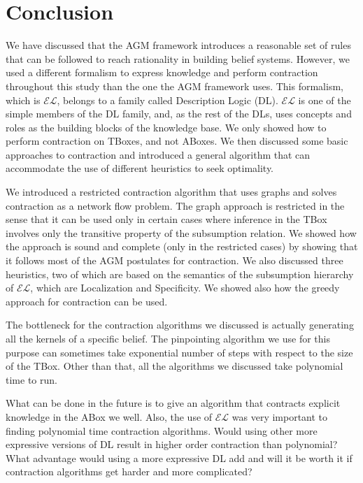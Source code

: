 \chapter{Conclusion}
We have discussed that the AGM framework introduces a reasonable set of rules that can be followed to reach rationality in building belief systems. However, we used a different formalism to express knowledge and perform contraction throughout this study than the one the AGM framework uses. This formalism, which is $\mathcal{EL}$, belongs to a family called Description Logic (DL). $\mathcal{EL}$ is one of the simple members of the DL family, and, as the rest of the DLs, uses concepts and roles as the building blocks of the knowledge base. We only showed how to perform contraction on TBoxes, and not ABoxes. We then discussed some basic approaches to contraction and introduced a general algorithm that can accommodate the use of different heuristics to seek optimality. 

We introduced a restricted contraction algorithm that uses graphs and solves contraction as a network flow problem. The graph approach is restricted in the sense that it can be used only in certain cases where inference in the TBox involves only the transitive property of the subsumption relation. We showed how the approach is sound and complete (only in the restricted cases) by showing that it follows most of the AGM postulates for contraction. We also discussed three heuristics, two of which are based on the semantics of the subsumption hierarchy of $\mathcal{EL}$, which are Localization and Specificity. We showed also how the greedy approach for contraction can be used.

The bottleneck for the contraction algorithms we discussed is actually generating all the kernels of a specific belief. The pinpointing algorithm we use for this purpose can sometimes take exponential number of steps with respect to the size of the TBox. Other than that, all the algorithms we discussed take polynomial time to run. 

What can be done in the future is to give an algorithm that contracts explicit knowledge in the ABox we well. Also, the use of $\mathcal{EL}$ was very important to finding polynomial time contraction algorithms. Would using other more expressive versions of DL result in higher order contraction than polynomial? What advantage would using a more expressive DL add and will it be worth it if contraction algorithms get harder and more complicated? 